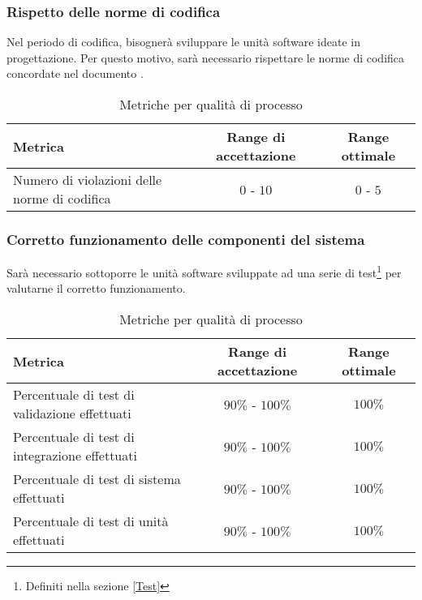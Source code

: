 \documentclass[../PianoDiQualifica.tex]{subfiles}
\begin{document}
			\subsubsection{Rispetto delle norme di codifica}
				Nel periodo di codifica, bisognerà sviluppare le unità software ideate in
				progettazione. Per questo motivo, sarà necessario rispettare le norme di codifica
				concordate nel documento \normediprogetto.\\
				\normalsize
				\begin{table}[H]
				\center
					\begin{tabular}{|p{6.5cm}|c|c|}
						\hline
						\rowcolor{blue!30}\textbf{Metrica} & \textbf{Range di accettazione} & \textbf{Range ottimale} \\ \hline
						Numero di violazioni delle norme di codifica & $0$ - $10$ & $0$ - $5$\\ \hline
					\end{tabular}
					\caption{Metriche per qualità di processo}
				\end{table}
			\subsubsection{Corretto funzionamento delle componenti del sistema}
				Sarà necessario sottoporre le unità software sviluppate ad una serie di test\footnote{Definiti nella sezione \ref{Test}}
				per valutarne il corretto funzionamento.\\
				\normalsize
				\begin{table}[H]
				\center
					\begin{tabular}{|p{6.5cm}|c|c|}
						\hline
						\rowcolor{blue!30}\textbf{Metrica} & \textbf{Range di accettazione} & \textbf{Range ottimale} \\ \hline
						Percentuale di test di validazione effettuati & $90\%$ - $100\%$ & $100\%$\\ \hline
						Percentuale di test di integrazione effettuati & $90\%$ - $100\%$ & $100\%$\\ \hline
						Percentuale di test di sistema effettuati & $90\%$ - $100\%$ & $100\%$\\ \hline
						Percentuale di test di unità effettuati & $90\%$ - $100\%$ & $100\%$\\ \hline
					\end{tabular}
					\caption{Metriche per qualità di processo}
				\end{table}
\end{document}
